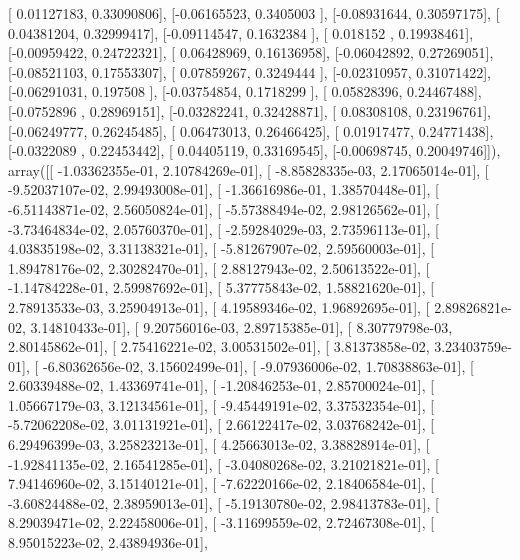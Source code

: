 \documentclass{article}
\begin{document}
       [ 0.01127183,  0.33090806],
       [-0.06165523,  0.3405003 ],
       [-0.08931644,  0.30597175],
       [ 0.04381204,  0.32999417],
       [-0.09114547,  0.1632384 ],
       [ 0.018152  ,  0.19938461],
       [-0.00959422,  0.24722321],
       [ 0.06428969,  0.16136958],
       [-0.06042892,  0.27269051],
       [-0.08521103,  0.17553307],
       [ 0.07859267,  0.3249444 ],
       [-0.02310957,  0.31071422],
       [-0.06291031,  0.197508  ],
       [-0.03754854,  0.1718299 ],
       [ 0.05828396,  0.24467488],
       [-0.0752896 ,  0.28969151],
       [-0.03282241,  0.32428871],
       [ 0.08308108,  0.23196761],
       [-0.06249777,  0.26245485],
       [ 0.06473013,  0.26466425],
       [ 0.01917477,  0.24771438],
       [-0.0322089 ,  0.22453442],
       [ 0.04405119,  0.33169545],
       [-0.00698745,  0.20049746]]), array([[ -1.03362355e-01,   2.10784269e-01],
       [ -8.85828335e-03,   2.17065014e-01],
       [ -9.52037107e-02,   2.99493008e-01],
       [ -1.36616986e-01,   1.38570448e-01],
       [ -6.51143871e-02,   2.56050824e-01],
       [ -5.57388494e-02,   2.98126562e-01],
       [ -3.73464834e-02,   2.05760370e-01],
       [ -2.59284029e-03,   2.73596113e-01],
       [  4.03835198e-02,   3.31138321e-01],
       [ -5.81267907e-02,   2.59560003e-01],
       [  1.89478176e-02,   2.30282470e-01],
       [  2.88127943e-02,   2.50613522e-01],
       [ -1.14784228e-01,   2.59987692e-01],
       [  5.37775843e-02,   1.58821620e-01],
       [  2.78913533e-03,   3.25904913e-01],
       [  4.19589346e-02,   1.96892695e-01],
       [  2.89826821e-02,   3.14810433e-01],
       [  9.20756016e-03,   2.89715385e-01],
       [  8.30779798e-03,   2.80145862e-01],
       [  2.75416221e-02,   3.00531502e-01],
       [  3.81373858e-02,   3.23403759e-01],
       [ -6.80362656e-02,   3.15602499e-01],
       [ -9.07936006e-02,   1.70838863e-01],
       [  2.60339488e-02,   1.43369741e-01],
       [ -1.20846253e-01,   2.85700024e-01],
       [  1.05667179e-03,   3.12134561e-01],
       [ -9.45449191e-02,   3.37532354e-01],
       [ -5.72062208e-02,   3.01131921e-01],
       [  2.66122417e-02,   3.03768242e-01],
       [  6.29496399e-03,   3.25823213e-01],
       [  4.25663013e-02,   3.38828914e-01],
       [ -1.92841135e-02,   2.16541285e-01],
       [ -3.04080268e-02,   3.21021821e-01],
       [  7.94146960e-02,   3.15140121e-01],
       [ -7.62220166e-02,   2.18406584e-01],
       [ -3.60824488e-02,   2.38959013e-01],
       [ -5.19130780e-02,   2.98413783e-01],
       [  8.29039471e-02,   2.22458006e-01],
       [ -3.11699559e-02,   2.72467308e-01],
       [  8.95015223e-02,   2.43894936e-01],
\end{document}
